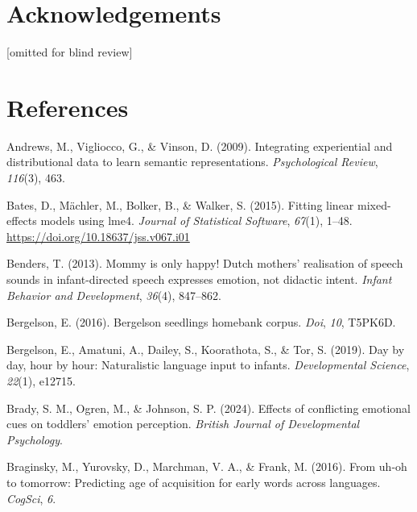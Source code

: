 \documentclass[10pt, letterpaper]{article}
\begin{document}
\section{Acknowledgements}\label{acknowledgements}

{[}omitted for blind review{]}

\section{References}\label{references}

\setlength{\parindent}{-0.1in} 
\setlength{\leftskip}{0.125in}

\noindent

\label{refs}
\begin{CSLReferences}{1}{0}
Andrews, M., Vigliocco, G., \& Vinson, D. (2009). Integrating
experiential and distributional data to learn semantic representations.
\emph{Psychological Review}, \emph{116}(3), 463.

Bates, D., Mächler, M., Bolker, B., \& Walker, S. (2015). Fitting linear
mixed-effects models using {lme4}. \emph{Journal of Statistical
Software}, \emph{67}(1), 1--48.
\url{https://doi.org/10.18637/jss.v067.i01}

Benders, T. (2013). Mommy is only happy! Dutch mothers' realisation of
speech sounds in infant-directed speech expresses emotion, not didactic
intent. \emph{Infant Behavior and Development}, \emph{36}(4), 847--862.

Bergelson, E. (2016). Bergelson seedlings homebank corpus. \emph{Doi},
\emph{10}, T5PK6D.

Bergelson, E., Amatuni, A., Dailey, S., Koorathota, S., \& Tor, S.
(2019). Day by day, hour by hour: Naturalistic language input to
infants. \emph{Developmental Science}, \emph{22}(1), e12715.

Brady, S. M., Ogren, M., \& Johnson, S. P. (2024). Effects of
conflicting emotional cues on toddlers' emotion perception.
\emph{British Journal of Developmental Psychology}.

Braginsky, M., Yurovsky, D., Marchman, V. A., \& Frank, M. (2016). From
uh-oh to tomorrow: Predicting age of acquisition for early words across
languages. \emph{CogSci}, \emph{6}.


\end{CSLReferences}
\end{document}
